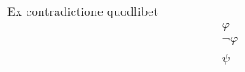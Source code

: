 \begin{ruleinf} \label{relinf_impadd} Ex contradictione quodlibet
	\begin{equation}
	\begin{gathered}
	    \varphi \\
		\underline {\lnot \varphi } \\
		\psi 
	\end{gathered}
	\end{equation}
\end{ruleinf}
